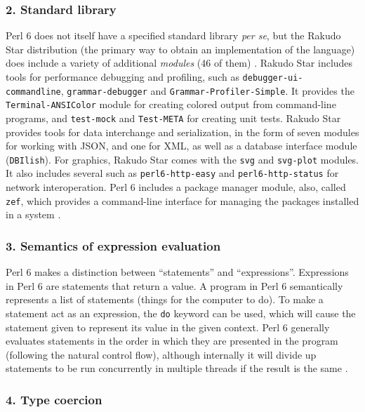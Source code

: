 \documentclass[14pt,english]{extarticle}
\begin{document}
\subsubsection*{2. Standard library}

Perl 6 does not itself have a specified standard library \emph{per
se}, but the Rakudo Star distribution (the primary way to obtain an
implementation of the language) does include a variety of additional
\emph{modules} (46 of them) \cite{New1}. Rakudo Star includes tools
for performance debugging and profiling, such as \texttt{debugger-ui-commandline},
\texttt{grammar-debugger} and \texttt{Grammar-Profiler-Simple}. It
provides the \texttt{Terminal-ANSIColor} module for creating colored
output from command-line programs, and \texttt{test-mock} and \texttt{Test-META}
for creating unit tests. Rakudo Star provides tools for data interchange
and serialization, in the form of seven modules for working with JSON,
and one for XML, as well as a database interface module (\texttt{DBIlish}).
For graphics, Rakudo Star comes with the \texttt{svg} and \texttt{svg-plot}
modules. It also includes several such as \texttt{perl6-http-easy}
and \texttt{perl6-http-status} for network interoperation. Perl 6
includes a package manager module, also, called \texttt{zef}, which
provides a command-line interface for managing the packages installed
in a system \cite{New1}.


\subsubsection*{3. Semantics of expression evaluation}

Perl 6 makes a distinction between ``statements'' and ``expressions''.
Expressions in Perl 6 are statements that return a value. A program
in Perl 6 semantically represents a list of statements (things for
the computer to do). To make a statement act as an expression, the
\texttt{do} keyword can be used, which will cause the statement given
to represent its value in the given context. Perl 6 generally evaluates
statements in the order in which they are presented in the program
(following the natural control flow), although internally it will
divide up statements to be run concurrently in multiple threads if
the result is the same \cite{Documentation}.


\subsubsection*{4. Type coercion}
\end{document}
